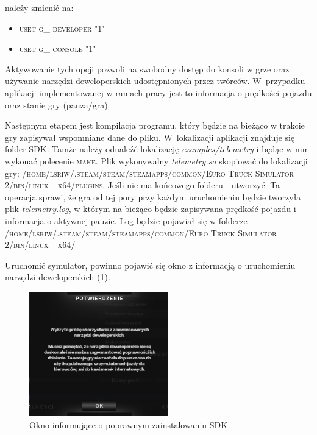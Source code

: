 należy zmienić na:

\begin{itemize}
\item \textsc{uset g\_ developer "1"}
\item \textsc{uset g\_ console "1"}
\end{itemize}

Aktywowanie tych opcji pozwoli na swobodny dostęp do konsoli w grze oraz używanie narzędzi deweloperskich udostępnionych przez twórców. 
W~przypadku aplikacji implementowanej w ramach pracy jest to informacja o prędkości pojazdu oraz stanie gry (pauza/gra). %

Następnym etapem jest kompilacja programu, który będzie na bieżąco w trakcie gry zapisywał wspomniane dane do pliku.
W~lokalizacji aplikacji znajduje się folder SDK. %
Tamże należy odnaleźć lokalizację \textit{examples/telemetry} i będąc w nim wykonać polecenie \textsc{make}. %
Plik wykonywalny \textit{telemetry.so} skopiować do lokalizacji gry: \textsc{/home/lsriw/.steam/steam/steamapps/common/Euro Truck Simulator 2/bin/linux\_ x64/plugins}. Jeśli nie ma końcowego folderu - utworzyć.
Ta operacja sprawi, że gra od tej pory przy każdym uruchomieniu będzie tworzyła plik \textit{telemetry.log}, w którym na bieżąco będzie zapisywana prędkość pojazdu i informacja o aktywnej pauzie. Log będzie pojawiał się w folderze \textsc{/home/lsriw/.steam/steam/steamapps/common/Euro Truck Simulator 2/bin/linux\_ x64/}

Uruchomić symulator, powinno pojawić się okno z informacją o uruchomieniu narzędzi deweloperskich (\ref{fig:appendix1_dev_tools}).

\begin{figure}
  \centering
  \includegraphics[width=6cm]{img/appendix1_devtools.png}
  \caption{Okno informujące o poprawnym zainstalowaniu SDK}
  \label{fig:appendix1_dev_tools}
\end{figure}

